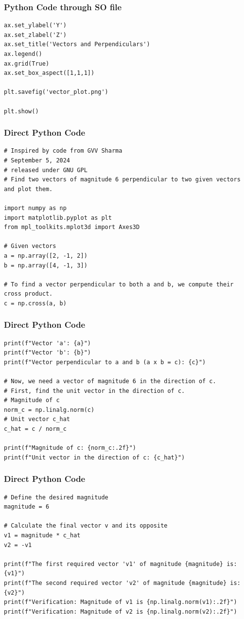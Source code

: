 \documentclass{beamer}
\begin{document}
\begin{frame}[fragile]
\frametitle{Python Code through SO file}
\begin{lstlisting}
ax.set_ylabel('Y')
ax.set_zlabel('Z')
ax.set_title('Vectors and Perpendiculars')
ax.legend()
ax.grid(True)
ax.set_box_aspect([1,1,1])

plt.savefig('vector_plot.png')

plt.show()
\end{lstlisting}
\end{frame}

\begin{frame}[fragile]
\frametitle{Direct Python Code}
\begin{lstlisting}
# Inspired by code from GVV Sharma
# September 5, 2024
# released under GNU GPL
# Find two vectors of magnitude 6 perpendicular to two given vectors and plot them.

import numpy as np
import matplotlib.pyplot as plt
from mpl_toolkits.mplot3d import Axes3D

# Given vectors
a = np.array([2, -1, 2])
b = np.array([4, -1, 3])

# To find a vector perpendicular to both a and b, we compute their cross product.
c = np.cross(a, b)
\end{lstlisting}
\end{frame}

\begin{frame}[fragile]
\frametitle{Direct Python Code}
\begin{lstlisting}
print(f"Vector 'a': {a}")
print(f"Vector 'b': {b}")
print(f"Vector perpendicular to a and b (a x b = c): {c}")

# Now, we need a vector of magnitude 6 in the direction of c.
# First, find the unit vector in the direction of c.
# Magnitude of c
norm_c = np.linalg.norm(c)
# Unit vector c_hat
c_hat = c / norm_c

print(f"Magnitude of c: {norm_c:.2f}")
print(f"Unit vector in the direction of c: {c_hat}")
\end{lstlisting}
\end{frame}

\begin{frame}[fragile]
\frametitle{Direct Python Code}
\begin{lstlisting}
# Define the desired magnitude
magnitude = 6

# Calculate the final vector v and its opposite
v1 = magnitude * c_hat
v2 = -v1

print(f"The first required vector 'v1' of magnitude {magnitude} is: {v1}")
print(f"The second required vector 'v2' of magnitude {magnitude} is: {v2}")
print(f"Verification: Magnitude of v1 is {np.linalg.norm(v1):.2f}")
print(f"Verification: Magnitude of v2 is {np.linalg.norm(v2):.2f}")
\end{lstlisting}
\end{frame}
\end{document}
